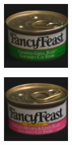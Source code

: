 \begin{figure}[htbp]
\begin{subfigure}{80pt}
    \caption{}
	\end{subfigure}
	\begin{subfigure}{80pt}
        \centering
    \includegraphics[width=\textwidth]{figures/coil_original/29.png}
    \caption{}
	\end{subfigure}
	\begin{subfigure}{80pt}
        \centering
    \includegraphics[width=\textwidth]{figures/coil_original/32.png}

\end{subfigure}
\end{figure}
